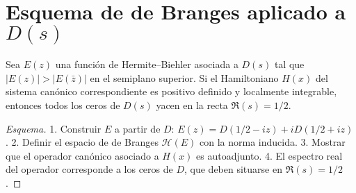 \section{Esquema de de Branges aplicado a $D(s)$}

\begin{theorem}
Sea $E(z)$ una función de Hermite--Biehler asociada a $D(s)$ tal que
$|E(z)|>|E(\bar z)|$ en el semiplano superior. 
Si el Hamiltoniano $H(x)$ del sistema canónico correspondiente es positivo definido 
y localmente integrable, entonces todos los ceros de $D(s)$ yacen en la recta $\Re(s)=1/2$.
\end{theorem}

\begin{proof}[Esquema]
1. Construir $E$ a partir de $D$: $E(z)=D(1/2-iz)+iD(1/2+iz)$.
2. Definir el espacio de de Branges $\mathcal{H}(E)$ con la norma inducida.
3. Mostrar que el operador canónico asociado a $H(x)$ es autoadjunto.
4. El espectro real del operador corresponde a los ceros de $D$,
   que deben situarse en $\Re(s)=1/2$.
\end{proof}
